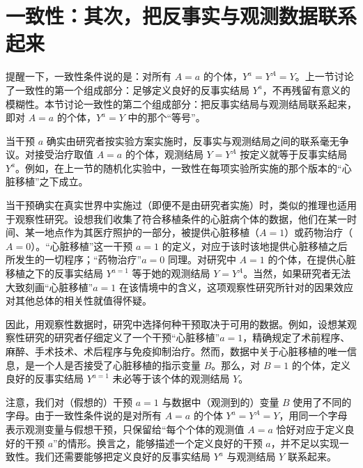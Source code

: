 \section{一致性：其次，把反事实与观测数据联系起来}

提醒一下，一致性条件说的是：对所有 $A=a$ 的个体，$Y^{a}=Y^{A}=Y$。上一节讨论了一致性的第一个组成部分：足够定义良好的反事实结局 $Y^{a}$，不再残留有意义的模糊性。本节讨论一致性的第二个组成部分：把反事实结局与观测结局联系起来，即对 $A=a$ 的个体，$Y^{a}=Y$ 中的那个“等号”。

当干预 $a$ 确实由研究者按实验方案实施时，反事实与观测结局之间的联系毫无争议。对接受治疗取值 $A=a$ 的个体，观测结局 $Y=Y^{A}$ 按定义就等于反事实结局 $Y^{a}$。例如，在上一节的随机化实验中，一致性在每项实验所实施的那个版本的“心脏移植”之下成立。

当干预确实在真实世界中实施过（即便不是由研究者实施）时，类似的推理也适用于观察性研究。设想我们收集了符合移植条件的心脏病个体的数据，他们在某一时间、某一地点作为其医疗照护的一部分，被提供心脏移植（$A=1$）或药物治疗（$A=0$）。“心脏移植”这一干预 $a=1$ 的定义，对应于该时该地提供心脏移植之后所发生的一切程序；“药物治疗”$a=0$ 同理。对研究中 $A=1$ 的个体，在提供心脏移植之下的反事实结局 $Y^{a=1}$ 等于她的观测结局 $Y=Y^{A}$。当然，如果研究者无法大致刻画“心脏移植”$a=1$ 在该情境中的含义，这项观察性研究所针对的因果效应对其他总体的相关性就值得怀疑。


因此，用观察性数据时，研究中选择何种干预取决于可用的数据。例如，设想某观察性研究的研究者仔细定义了一个干预“心脏移植”$a=1$，精确规定了术前程序、麻醉、手术技术、术后程序与免疫抑制治疗。然而，数据中关于心脏移植的唯一信息，是一个人是否接受了心脏移植的指示变量 $B$。那么，对 $B=1$ 的个体，定义良好的反事实结局 $Y^{a=1}$ 未必等于该个体的观测结局 $Y$。

注意，我们对（假想的）干预 $a=1$ 与数据中（观测到的）变量 $B$ 使用了不同的字母。由于一致性条件说的是对所有 $A=a$ 的个体 $Y^{a}=Y^{A}=Y$，用同一个字母表示观测变量与假想干预，只保留给“每个个体的观测值 $A=a$ 恰好对应于定义良好的干预 $a$”的情形。换言之，能够描述一个定义良好的干预 $a$，并不足以实现一致性。我们还需要能够把定义良好的反事实结局 $Y^{a}$ 与观测结局 $Y$ 联系起来。

